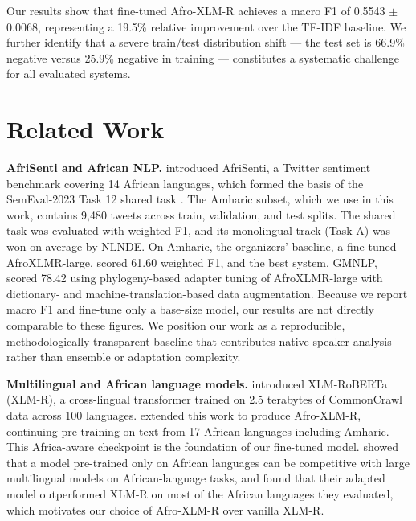 Our results show that fine-tuned Afro-XLM-R achieves a macro F1 of 0.5543 $\pm$ 0.0068, representing a 19.5\% relative improvement over the TF-IDF baseline. We further identify that a severe train/test distribution shift --- the test set is 66.9\% negative versus 25.9\% negative in training --- constitutes a systematic challenge for all evaluated systems.


\section{Related Work}

\textbf{AfriSenti and African NLP.} \citet{muhammad-etal-2023-afrisenti} introduced AfriSenti, a Twitter sentiment benchmark covering 14 African languages, which formed the basis of the SemEval-2023 Task 12 shared task \citep{muhammad-etal-2023-semeval}. The Amharic subset, which we use in this work, contains 9,480 tweets across train, validation, and test splits. The shared task was evaluated with weighted F1, and its monolingual track (Task A) was won on average by NLNDE. On Amharic, the organizers' baseline, a fine-tuned AfroXLMR-large, scored 61.60 weighted F1, and the best system, GMNLP, scored 78.42 using phylogeny-based adapter tuning of AfroXLMR-large with dictionary- and machine-translation-based data augmentation. Because we report macro F1 and fine-tune only a base-size model, our results are not directly comparable to these figures. We position our work as a reproducible, methodologically transparent baseline that contributes native-speaker analysis rather than ensemble or adaptation complexity.

\textbf{Multilingual and African language models.} \citet{conneau-etal-2020-unsupervised} introduced XLM-RoBERTa (XLM-R), a cross-lingual transformer trained on 2.5 terabytes of CommonCrawl data across 100 languages. \citet{alabi-etal-2022-adapting} extended this work to produce Afro-XLM-R, continuing pre-training on text from 17 African languages including Amharic. This Africa-aware checkpoint is the foundation of our fine-tuned model. \citet{ogueji-etal-2021-small} showed that a model pre-trained only on African languages can be competitive with large multilingual models on African-language tasks, and \citet{alabi-etal-2022-adapting} found that their adapted model outperformed XLM-R on most of the African languages they evaluated, which motivates our choice of Afro-XLM-R over vanilla XLM-R.

